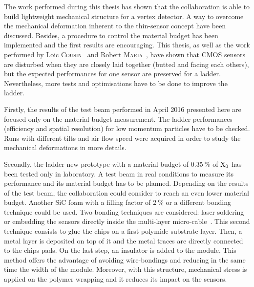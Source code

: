 
The work performed during this thesis has shown that the collaboration is able to build lightweight mechanical structure for a vertex detector.
A way to overcome the mechanical deformation inherent to the thin-sensor concept have been discussed.
Besides, a procedure to control the material budget has been implemented and the first results are encouraging.
This thesis, as well as the work performed by Loic \textsc{Cousin}~\cite{cousin} and Robert \textsc{Maria}~\cite{maria}, have shown that \gls{CMOS} sensors are disturbed when they are closely laid together (butted and facing each others), but the expected performances for one sensor are preserved for a ladder.
Nevertheless, more tests and optimisations have to be done to improve the ladder.

Firstly, the results of the test beam performed in April 2016 presented here are focused only on the material budget measurement.
The ladder performances (efficiency and spatial resolution) for low momentum particles have to be checked.
Runs with different tilts and air flow speed were acquired in order to study the mechanical deformations in more details.

Secondly, the ladder new prototype with a material budget of $0.35~\%$ of $\rm{X_{0}}$ has been tested only in laboratory.
A test beam in real conditions to measure its performance and its material budget has to be planned.
Depending on the results of the test beam, the collaboration could consider to reach an even lower material budget.
Another \gls{SiC} foam with a filling factor of $2~\%$ or a different bonding technique could be used.
Two bonding  techniques are considered: laser soldering or embedding the sensors directly inside the multi-layer micro-cable~\cite{Baudot2012}.
This second technique consists to glue the chips on a first polymide substrate layer.
Then, a metal layer is deposited on top of it and the metal traces are directly connected to the chips pads.
On the last step, an insulator is added to the module.
This method offers the advantage of avoiding wire-bondings and reducing in the same time the width of the module.
Moreover, with this structure, mechanical stress is applied on the polymer wrapping and it reduces its impact on the sensors.

